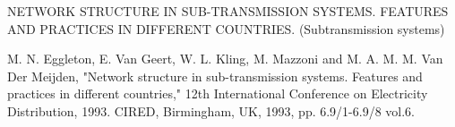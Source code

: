 NETWORK STRUCTURE IN SUB-TRANSMISSION SYSTEMS. FEATURES AND PRACTICES IN DIFFERENT COUNTRIES. (Subtransmission systems)

M. N. Eggleton, E. Van Geert, W. L. Kling, M. Mazzoni and M. A. M. M. Van Der Meijden, "Network structure in sub-transmission systems. Features and practices in different countries," 12th International Conference on Electricity Distribution, 1993. CIRED, Birmingham, UK, 1993, pp. 6.9/1-6.9/8 vol.6.

